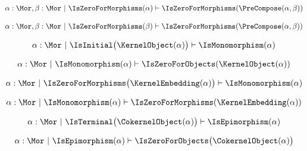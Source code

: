 \begin{sequent}
\begin{align*}
   \alpha: \Mor, \beta: \Mor ~|~ \IsZeroForMorphisms(\alpha) \vdash \IsZeroForMorphisms(\PreCompose(\alpha,\beta))
\end{align*}
\end{sequent}

\begin{sequent}
\begin{align*}
   \alpha: \Mor, \beta: \Mor ~|~ \IsZeroForMorphisms(\beta) \vdash \IsZeroForMorphisms(\PreCompose(\alpha,\beta))
\end{align*}
\end{sequent}

\begin{sequent}
\begin{align*}
  \alpha: \Mor ~|~ \IsInitial\big( \KernelObject( \alpha ) \big) \vdash \IsMonomorphism( \alpha )
\end{align*}
\end{sequent}

\begin{sequent}
\begin{align*}
  \alpha: \Mor ~|~ \IsMonomorphism( \alpha ) \vdash \IsZeroForObjects( \KernelObject( \alpha ) )
\end{align*}
\end{sequent}

\begin{sequent}
\begin{align*}
  \alpha: \Mor ~|~ \IsZeroForMorphisms\big( \KernelEmbedding( \alpha ) \big) \vdash \IsMonomorphism( \alpha )
\end{align*}
\end{sequent}

\begin{sequent}
\begin{align*}
  \alpha: \Mor ~|~ \IsMonomorphism( \alpha ) \vdash \IsZeroForMorphisms( \KernelEmbedding( \alpha ) )
\end{align*}
\end{sequent}

\begin{sequent}
\begin{align*}
  \alpha: \Mor ~|~ \IsTerminal\big( \CokernelObject( \alpha ) \big) \vdash \IsEpimorphism( \alpha )
\end{align*}
\end{sequent}

\begin{sequent}
\begin{align*}
  \alpha: \Mor ~|~ \IsEpimorphism( \alpha ) \vdash \IsZeroForObjects\big( \CokernelObject( \alpha ) \big)
\end{align*}
\end{sequent}

